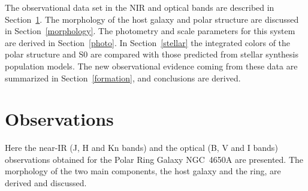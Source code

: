 \documentclass[preprint]{aastex}
\begin{document}
The observational data set in the NIR and optical bands are described 
in Section~\ref{obs}. The morphology of the 
host galaxy and polar structure are discussed in Section~\ref{morphology}. 
The photometry and scale parameters for this system are derived in
Section~\ref{photo}. 
In Section~\ref{stellar} the integrated colors of the
polar structure and S0 are compared with those predicted from stellar
synthesis population models.
The new observational evidence coming from these data are summarized
in Section~\ref{formation}, and conclusions are derived.



\section{Observations}\label{obs}
Here the near-IR (J, H and Kn bands) and the
optical (B, V and I bands) observations obtained for the Polar Ring 
Galaxy NGC~4650A are presented.
The morphology of the two main components, the host galaxy and the ring,
are derived and discussed.
\end{document}

